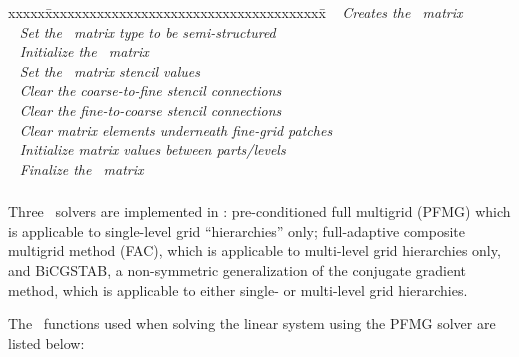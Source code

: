 \documentclass[10pt]{article}
\begin{document}
\begin{tabbing}
xxxxx\=xxxxxxxxxxxxxxxxxxxxxxxxxxxxxxxxxxxxxx\=\kill
\> \done\ 
   \> \textit{Creates the \hypre\ matrix} \\
\> \done\ 
   \> \textit{Set the \hypre\ matrix type to be semi-structured} \\
\> \done\ 
   \> \textit{Initialize the  \hypre\ matrix} \\
\> \done\ 
   \> \textit{Set the \hypre\ matrix stencil values} \\
\> \done\ 
   \> \textit{Clear the coarse-to-fine stencil connections} \\
\> \done\ 
   \> \textit{Clear the fine-to-coarse stencil connections} \\
\> \done\ 
   \> \textit{Clear matrix elements underneath fine-grid patches} \\
\> \done\ 
   \> \textit{Initialize matrix values between parts/levels} \\
\> \done\ 
   \> \textit{Finalize the \hypre\ matrix}
\end{tabbing}


\subsubsection{}


Three \hypre\ solvers are implemented in :
pre-conditioned full multigrid (PFMG) which is applicable to
single-level grid ``hierarchies'' only; full-adaptive composite
multigrid method (FAC), which is applicable to multi-level grid
hierarchies only, and BiCGSTAB, a non-symmetric generalization of the
conjugate gradient method, which is applicable to either single- or
multi-level grid hierarchies.

The \hypre\ functions used when solving the linear system using
the PFMG solver are listed below:
\end{document}
